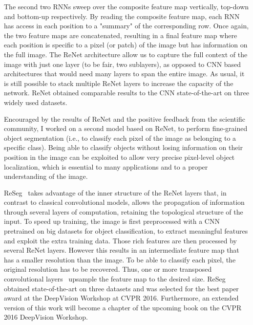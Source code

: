 The second two RNNs sweep over the composite feature map vertically, top-down
and bottom-up respectively. By reading the composite feature map, each RNN has
access in each position to a "summary" of the corresponding row. Once again,
the two feature maps are concatenated, resulting in a final feature map where
each position is specific to a pixel (or patch) of the image but has
information on the full image. The ReNet architecture allow us to capture the
full context of the image with just one layer (to be fair, two sublayers), as
opposed to CNN based architectures that would need many layers to span the
entire image. As usual, it is still possible to stack multiple ReNet layers to
increase the capacity of the network. ReNet obtained comparable results to the
CNN state-of-the-art on three widely used datasets.

Encouraged by the results of ReNet and the positive feedback from the
scientific community, I worked on a second model based on ReNet, to perform
fine-grained object segmentation (i.e., to classify each pixel of the image as
belonging to a specific class). Being able to classify objects without losing
information on their position in the image can be exploited to allow very
precise pixel-level object localization, which is essential to many
applications and to a proper understanding of the image.

ReSeg~\citep{Visin_2016_CVPR_Workshops} takes advantage of the inner structure
of the ReNet layers that, in contrast to classical convolutional models, allows
the propagation of information through several layers of computation, retaining
the topological structure of the input. To speed up training, the image is
first preprocessed with a CNN pretrained on big datasets for object
classification, to extract meaningful features and exploit the extra training
data. Those rich features are then processed by several ReNet layers. However
this results in an intermediate feature map that has a smaller resolution
than the image. To be able to classify each pixel, the original resolution has
to be recovered. Thus, one or more transposed convolutional layers~\citep{
dumoulin2016guide} upsample the feature map to the desired size. ReSeg obtained
state-of-the-art on three datasets and was selected for the best paper award at
the DeepVision Workshop at CVPR 2016. Furthermore, an extended version of this
work will become a chapter of the upcoming book on the CVPR 2016 DeepVision
Workshop.

